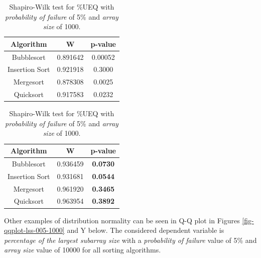 \begin{table}[H]
    \parbox{.45\linewidth}{
        \caption{Shapiro-Wilk test for \%LSS with \textit{probability of failure} of 5\% and \textit{array size} of 1000.}
        \begin{center}
        \begin{tabular}{|c|c|c|}
        \hline
        \textbf{Algorithm} & \textbf{W} & \textbf{p-value} \\
        \hline
        Bubblesort & 0.891642 & 0.00052 \\
        \hline
        Insertion Sort & 0.921918 & 0.3000 \\
        \hline
        Mergesort & 0.878308 & 0.0025 \\
        \hline
        Quicksort & 0.917583 & 0.0232 \\
        \hline
        \end{tabular}
        \label{table-shapiro-test-lss-005-1000}
        \end{center}
    }
    \hfill
    \parbox{.45\linewidth}{
        \caption{Shapiro-Wilk test for \%UEQ with \textit{probability of failure} of 5\% and \textit{array size} of 1000.}
        \begin{center}
        \begin{tabular}{|c|c|c|}
        \hline
        \textbf{Algorithm} & \textbf{W} & \textbf{p-value} \\
        \hline
        Bubblesort & 0.936459 & \textbf{0.0730} \\
        \hline
        Insertion Sort & 0.931681 & \textbf{0.0544} \\
        \hline
        Mergesort & 0.961920 & \textbf{0.3465} \\
        \hline
        Quicksort & 0.963954 & \textbf{0.3892} \\
        \hline
        \end{tabular}
        \label{table-shapiro-test-ueq-005-1000}
        \end{center}
    }
\end{table}

Other examples of distribution normality can be seen in Q-Q plot in Figures \ref{fig-qqplot-lss-005-1000} and Y below. The considered dependent variable is \textit{percentage of the largest subarray size} with a \textit{probability of failure} value of 5\% and \textit{array size} value of 10000 for all sorting algorithms.

